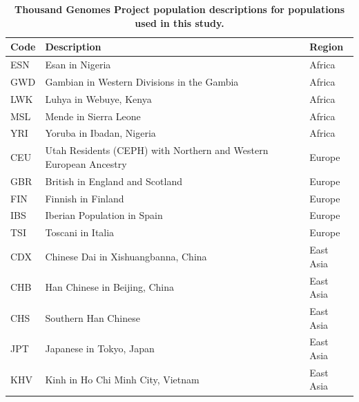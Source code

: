 \documentclass[]{article}
\begin{document}
\begin{table}[ht!]
    \centering
    \begin{tabular}{lll}
        \toprule
        Code & Description & Region\\
        \midrule
        ESN & Esan in Nigeria & Africa\\
        GWD & Gambian in Western Divisions in the Gambia & Africa\\
        LWK & Luhya in Webuye, Kenya & Africa\\
        MSL & Mende in Sierra Leone & Africa\\
        YRI & Yoruba in Ibadan, Nigeria & Africa\\
        \addlinespace
        CEU & Utah Residents (CEPH) with Northern and Western European Ancestry & Europe\\
        GBR & British in England and Scotland & Europe\\
        FIN & Finnish in Finland & Europe\\
        IBS & Iberian Population in Spain & Europe\\
        TSI & Toscani in Italia & Europe\\
        \addlinespace
        CDX & Chinese Dai in Xishuangbanna, China & East Asia\\
        CHB & Han Chinese in Beijing, China & East Asia\\
        CHS & Southern Han Chinese & East Asia\\
        JPT & Japanese in Tokyo, Japan & East Asia\\
        KHV & Kinh in Ho Chi Minh City, Vietnam & East Asia\\
        \bottomrule
    \end{tabular}
    \caption{
        \textbf{
            Thousand Genomes Project population descriptions
            for populations used in this study.
        }
    }
    \label{tab:1kgpops}
\end{table}
\end{document}
